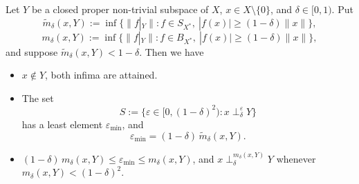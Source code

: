 \documentclass[10pt,a4paper]{amsart}
\begin{document}
\begin{proposition}\label{thm:bound}
Let $Y$ be a closed proper non-trivial subspace of $X$, $x \in X \setminus \{0\}$,
and $\delta \in [0,1)$. Put
\[
\widetilde m_\delta(x,Y) := \inf\bigl\{\|f|_Y\| : f \in S_{X^*},\
|f(x)| \geq (1-\delta)\|x\|\bigr\},
\]
\[
m_\delta(x,Y) := \inf\bigl\{\|f|_Y\| : f \in B_{X^*},\
|f(x)| \geq (1-\delta)\|x\|\bigr\},
\]
and suppose $\widetilde m_\delta(x,Y) < 1-\delta$. Then we have
\begin{itemize}
    \item[(a)] $x\notin Y$, both infima are attained.
    \item[(b)] The set
\[
S := \bigl\{\varepsilon \in [0,(1-\delta)^2) : x \perp_\delta^{\varepsilon} Y\bigr\}
\]
has a least element $\varepsilon_{\min}$, and
\[
\varepsilon_{\min} = (1-\delta)\,\widetilde m_\delta(x,Y).
\]
    \item[(c)] $(1-\delta)\,m_\delta(x,Y) \leq \varepsilon_{\min} \leq m_\delta(x,Y)$, and
$x \perp_\delta^{m_\delta(x,Y)} Y$ whenever $m_\delta(x,Y)<(1-\delta)^2$.
\end{itemize}
\end{proposition}
\end{document}
